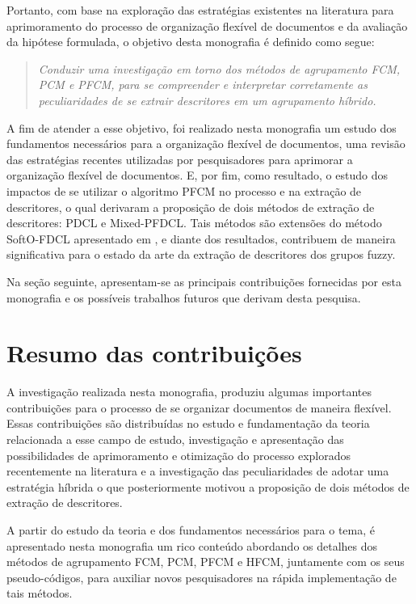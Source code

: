 Portanto, com base na exploração das estratégias existentes na literatura para aprimoramento do
processo de organização flexível de documentos e da avaliação da hipótese formulada, o objetivo
desta monografia é definido como segue:

\begin{quote}
\textit{Conduzir uma investigação em torno dos métodos de agrupamento FCM, PCM e PFCM, para
se compreender e interpretar corretamente as peculiaridades de se extrair descritores em um
agrupamento híbrido.}
\end{quote}

A fim de atender a esse objetivo, foi realizado nesta monografia um estudo dos fundamentos
necessários para a organização flexível de documentos, uma revisão das estratégias recentes
utilizadas por pesquisadores para aprimorar a organização flexível de documentos. E, por fim, como
resultado, o estudo dos impactos de se utilizar o algoritmo PFCM no processo e na extração de
descritores, o qual derivaram a proposição de dois métodos de extração de descritores: PDCL e
Mixed-PFDCL. Tais métodos são extensões do método SoftO-FDCL apresentado em \cite{Nogueira2013}, e
diante dos resultados, contribuem de maneira significativa para o estado da arte da extração de
descritores dos grupos fuzzy.

Na seção seguinte, apresentam-se as principais contribuições fornecidas por esta monografia e os
possíveis trabalhos futuros que derivam desta pesquisa.

\section{Resumo das contribuições}

A investigação realizada nesta monografia, produziu algumas importantes contribuições para o
processo de se organizar documentos de maneira flexível. Essas contribuições são distribuídas no estudo e
fundamentação da teoria relacionada a esse campo de estudo, investigação e apresentação das
possibilidades de aprimoramento e otimização do processo explorados recentemente na literatura e a
investigação das peculiaridades de adotar uma estratégia híbrida o que posteriormente motivou a
proposição de dois métodos de extração de descritores. 

A partir do estudo da teoria e dos fundamentos necessários para o tema, é apresentado nesta
monografia um rico conteúdo abordando os detalhes dos métodos de agrupamento FCM, PCM, PFCM e HFCM,
juntamente com os seus pseudo-códigos, para auxiliar novos pesquisadores na rápida implementação de
tais métodos.

